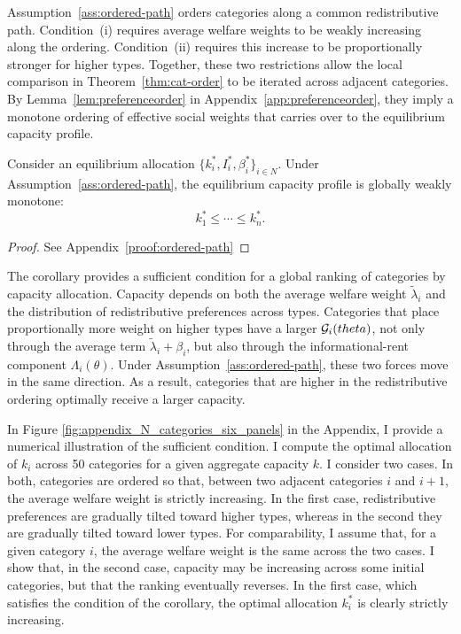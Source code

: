 \documentclass{class}
\begin{document}
Assumption~\ref{ass:ordered-path} orders categories along a common redistributive path. Condition~(i) requires average welfare weights to be weakly increasing along the ordering. Condition~(ii) requires this increase to be proportionally stronger for higher types. Together, these two restrictions allow the local comparison in Theorem~\ref{thm:cat-order} to be iterated across adjacent categories. By Lemma~\ref{lem:preferenceorder} in Appendix~\ref{app:preferenceorder}, they imply a monotone ordering of effective social weights that carries over to the equilibrium capacity profile.

\begin{corollary}\label{cor:ordered-path}
Consider an equilibrium allocation \(\{k_i^\ast,I_i^\ast,\beta_i^\ast\}_{i\in N}\). Under Assumption~\ref{ass:ordered-path}, the equilibrium capacity profile is globally weakly monotone:
\[
k_1^\ast\le\cdots\le k_n^\ast.
\]
\end{corollary}
\begin{proof}
    See Appendix~\ref{proof:ordered-path}
\end{proof}

The corollary provides a sufficient condition for a global ranking of categories by capacity allocation. Capacity depends on both the average welfare weight $\tilde\lambda_i$ and the distribution of redistributive preferences across types. Categories that place proportionally more weight on higher types have a larger $\mathcal{G}_i(theta)$, not only through the average term \(\tilde\lambda_i+\beta_i\), but also through the informational-rent component \(\Lambda_i(\theta)\). Under Assumption~\ref{ass:ordered-path}, these two forces move in the same direction. As a result, categories that are higher in the redistributive ordering optimally receive a larger capacity.

In Figure \ref{fig:appendix_N_categories_six_panels} in the Appendix, I provide a numerical illustration of the sufficient condition. I compute the optimal allocation of \(k_i\) across 50 categories for a given aggregate capacity \(k\). I consider two cases. In both, categories are ordered so that, between two adjacent categories \(i\) and \(i+1\), the average welfare weight is strictly increasing. In the first case, redistributive preferences are gradually tilted toward higher types, whereas in the second they are gradually tilted toward lower types. For comparability, I assume that, for a given category \(i\), the average welfare weight is the same across the two cases. I show that, in the second case, capacity may be increasing across some initial categories, but that the ranking eventually reverses. In the first case, which satisfies the condition of the corollary, the optimal allocation \(k_i^\ast\) is clearly strictly increasing.
\end{document}
